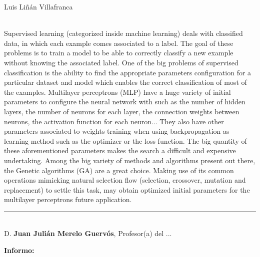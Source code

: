 \begin{center}

    Luis Liñán Villafranca\\

\end{center}

\vspace{0.5cm}
\vspace{0.7cm}

\\

Supervised learning (categorized inside machine learning) deals with classified
data, in which each example comes associated to a label. The goal of these
problems is to train a model to be able to correctly classify a new example
without knowing the associated label. One of the big problems of supervised
classification is the ability to find the appropriate parameters configuration
for a particular dataset and model which enables the correct classification of
most of the examples. Multilayer perceptrons (MLP) have a huge variety of
initial parameters to configure the neural network with such as the number of
hidden layers, the number of neurons for each layer, the connection weights
between neurons, the activation function for each neuron... They also have
other parameters associated to weights training when using backpropagation as
learning method such as the optimizer or the loss function. The big quantity of
these aforementioned parameters makes the search a difficult and expensive
undertaking. Among the big variety of methods and algorithms present out there,
the Genetic algorithms (GA) are a great choice. Making use of its common
operations mimicking natural selection flow (selection, crossover, mutation and
replacement) to settle this task, may obtain optimized initial parameters for
the multilayer perceptrons future application.


\cleardoublepage

\thispagestyle{empty}

\noindent\rule[-1ex]{\textwidth}{2pt}\\[4.5ex]

D. \textbf{Juan Julián Merelo Guervós}, Profesor(a) del ...

\vspace{0.5cm}

\textbf{Informo:}

